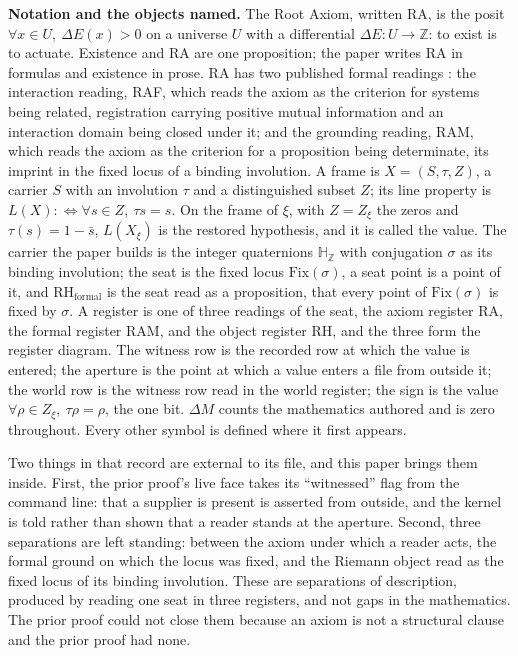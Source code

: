 \documentclass[10pt,twocolumn]{article}
\begin{document}
\textbf{Notation and the objects named.} The Root Axiom, written
\(\mathrm{RA}\), is the posit \(\forall x \in U,\ \Delta E(x) > 0\) on a
universe \(U\) with a differential \(\Delta E : U \to \mathbb{Z}\): to
exist is to actuate. Existence and \(\mathrm{RA}\) are one proposition;
the paper writes \(\mathrm{RA}\) in formulas and existence in prose.
\(\mathrm{RA}\) has two published formal readings \cite{islamraf}: the
interaction reading, RAF, which reads the axiom as the criterion for
systems being related, registration carrying positive mutual information
and an interaction domain being closed under it; and the grounding
reading, RAM, which reads the axiom as the criterion for a proposition
being determinate, its imprint in the fixed locus of a binding
involution. A frame is \(X = (S, \tau, Z)\), a carrier \(S\) with an
involution \(\tau\) and a distinguished subset \(Z\); its line property
is \(L(X) :\Leftrightarrow \forall s \in Z,\ \tau s = s\). On the frame
of \(\xi\), with \(Z = Z_\xi\) the zeros and \(\tau(s) = 1 - \bar{s}\),
\(L(X_\xi)\) is the restored hypothesis, and it is called the value. The
carrier the paper builds is the integer quaternions
\(\mathbb{H}_{\mathbb{Z}}\) with conjugation \(\sigma\) as its binding
involution; the seat is the fixed locus \(\mathrm{Fix}(\sigma)\), a seat
point is a point of it, and \(\mathrm{RH}_{\mathrm{formal}}\) is the
seat read as a proposition, that every point of \(\mathrm{Fix}(\sigma)\)
is fixed by \(\sigma\). A register is one of three readings of the seat,
the axiom register \(\mathrm{RA}\), the formal register
\(\mathrm{RAM}\), and the object register \(\mathrm{RH}\), and the three
form the register diagram. The witness row is the recorded row at which
the value is entered; the aperture is the point at which a value enters
a file from outside it; the world row is the witness row read in the
world register; the sign is the value
\(\forall \rho \in Z_\xi,\ \tau\rho = \rho\), the one bit. \(\Delta M\)
counts the mathematics authored and is zero throughout. Every other
symbol is defined where it first appears.

Two things in that record are external to its file, and this paper
brings them inside. First, the prior proof's live face takes its
``witnessed'' flag from the command line: that a supplier is present is
asserted from outside, and the kernel is told rather than shown that a
reader stands at the aperture. Second, three separations are left
standing: between the axiom under which a reader acts, the formal ground
on which the locus was fixed, and the Riemann object read as the fixed
locus of its binding involution. These are separations of description,
produced by reading one seat in three registers, and not gaps in the
mathematics. The prior proof could not close them because an axiom is
not a structural clause and the prior proof had none.
\end{document}
